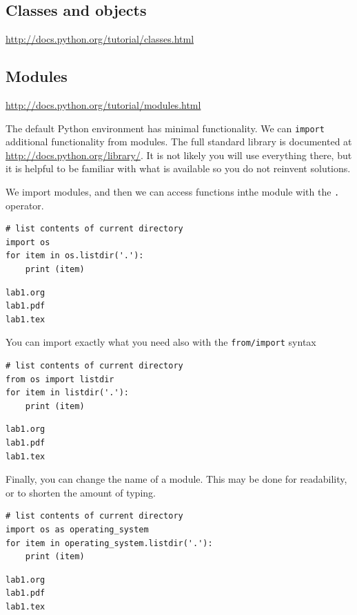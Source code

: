 \documentclass[11pt]{article}
\begin{document}
\subsection{Classes and objects}
\label{sec:org37642de}
\url{http://docs.python.org/tutorial/classes.html}


\subsection{Modules}
\label{sec:org1098fae}
\url{http://docs.python.org/tutorial/modules.html}

The default Python environment has minimal functionality. We can \texttt{import} additional functionality from modules. The full standard library is documented at \url{http://docs.python.org/library/}. It is not likely you will use everything there, but it is helpful to be familiar with what is available so you do not reinvent solutions.

We import modules, and then we can access functions inthe module with the \texttt{.} operator.

\begin{verbatim}
# list contents of current directory
import os
for item in os.listdir('.'):
    print (item)
\end{verbatim}

\begin{verbatim}
lab1.org
lab1.pdf
lab1.tex
\end{verbatim}

You can import exactly what you need also with the \texttt{from/import} syntax
\begin{verbatim}
# list contents of current directory
from os import listdir
for item in listdir('.'):
    print (item)
\end{verbatim}

\begin{verbatim}
lab1.org
lab1.pdf
lab1.tex
\end{verbatim}

Finally, you can change the name of a module. This may be done for readability, or to shorten the amount of typing.
\begin{verbatim}
# list contents of current directory
import os as operating_system
for item in operating_system.listdir('.'):
    print (item)
\end{verbatim}

\begin{verbatim}
lab1.org
lab1.pdf
lab1.tex
\end{verbatim}
\end{document}
